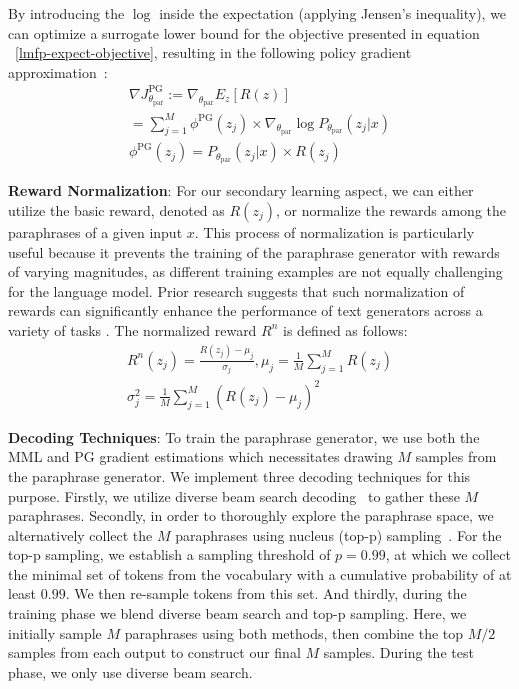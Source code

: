 \documentclass[11pt]{article}
\begin{document}
By introducing the $\log$ inside the expectation (applying Jensen's inequality), we can optimize a surrogate lower bound for the objective presented in equation ~\ref{lmfp-expect-objective}, resulting in the following policy gradient approximation~\cite{10.5555/3009657.3009806}:
\begin{multline}
\nabla J^{\text{PG}}_{\theta_{\text{par}}} := \nabla_{\theta_{\text{par}}} E_{z} [R(z)] \\ =
\sum^{M}_{j=1} \phi^{\text{PG}}(z_{j}) \times \nabla_{\theta_{\text{par}}} \log P_{\theta_{\text{par}}}(z_{j}|x) \\
\phi^{\text{PG}}(z_{j}) = P_{\theta_{\text{par}}}(z_{j}|x) \times R(z_{j})
\label{pg-objective}
\end{multline}

\textbf{Reward Normalization}:
\noindent
For our secondary learning aspect, we can either utilize the basic reward, denoted as $R(z_{j})$, or normalize the rewards among the paraphrases of a given input $x$. This process of normalization is particularly useful because it prevents the training of the paraphrase generator with rewards of varying magnitudes, as different training examples are not equally challenging for the language model. Prior research suggests that such normalization of rewards can significantly enhance the performance of text generators across a variety of tasks \cite{guo-etal-2022-efficient}. The normalized reward $R^{n}$ is defined as follows:
\begin{multline}
R^{n}(z_{j}) = \frac{R(z_{j}) - \mu_{j}}{\sigma_{j}}, \mu_{j} = \frac{1}{M} \sum^{M}_{j=1} R(z_{j}) \\
\sigma^{2}_{j} = \frac{1}{M} \sum^{M}_{j=1} (R(z_{j}) - \mu_{j})^2
\label{normal-reward}
\end{multline}

\textbf{Decoding Techniques}:
\noindent
To train the paraphrase generator, we use both the MML and PG gradient estimations which necessitates drawing $M$ samples from the paraphrase generator. We implement three decoding techniques for this purpose. Firstly, we utilize diverse beam search decoding~\cite{Vijayakumar_Cogswell_Selvaraju_Sun_Lee_Crandall_Batra_2018} to gather these $M$ paraphrases. Secondly, in order to thoroughly explore the paraphrase space, we alternatively collect the $M$ paraphrases using nucleus (top-p) sampling~\cite{holtzman2020curious}. For the top-p sampling, we establish a sampling threshold of $p=0.99$, at which we collect the minimal set of tokens from the vocabulary with a cumulative probability of at least $0.99$. We then re-sample tokens from this set. And thirdly, during the training phase we blend diverse beam search and top-p sampling. Here, we initially sample $M$ paraphrases using both methods, then combine the top $M/2$ samples from each output to construct our final $M$ samples. During the test phase, we only use diverse beam search.
\end{document}
